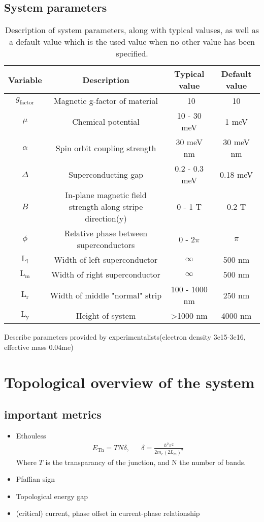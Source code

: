 \documentclass[10pt,a4paper]{article}
\begin{document}
	\subsection{System parameters}
	\begin{table}
		\begin{tabular}{|c|c|c|c|}
			\hline 
			Variable & Description & Typical value & Default value \\ 
			\hline 
			$g_\text{factor}$ & Magnetic g-factor of material & ~10 & 10 \\ 
			\hline 
			$\mu$ & Chemical potential &  10 - 30 meV & 1 meV\\ 
			\hline 
			$\alpha$ & Spin orbit coupling strength &  30 meV nm & 30 meV nm \\ 
			\hline 
			$\Delta$ & Superconducting gap & 0.2 - 0.3 meV & 0.18 meV\\ 
			\hline 
			$B$ & In-plane magnetic field strength along stripe direction(y) & 0 - 1 T & 0.2 T \\ 
			\hline 
			$\phi$ & Relative phase between superconductors &  0 - 2$\pi$ & $\pi$\\ 
			\hline 
			$\text{L}_\text{l}$ & Width of left superconductor & $\infty$ & 500 nm \\
			\hline 
			$\text{L}_\text{m}$ & Width of right superconductor & $\infty$ & 500 nm \\
			\hline
			$\text{L}_\text{r}$ & Width of middle "normal" strip & 100 - 1000 nm & 250 nm \\
			\hline
			$\text{L}_\text{y}$ & Height of system & \textgreater1000 nm & 4000 nm\\
			\hline
		\end{tabular} 
	\caption{Description of system parameters, along with typical valuses, as well as a default value which is the used value when no other value has been specified.}
	\label{tbl:system_pars}
	\end{table}
	Describe parameters provided by experimentalists(electron density 3e15-3e16, effective mass 0.04me)
\section{Topological overview of the system}
	\subsection{important metrics}
		\begin{itemize}
			\item \Gls{Ethouless}
				\begin{align}\label{eq:thouless}
				E_\text{Th} = TN\delta
				, && \delta = \frac{\hbar^2 \pi^2}
				{2 m_e \left( 2 L_m \right)^2}
				\end{align}
			Where $T$ is the transparancy of the junction, and N the number of bands.
			\item Pfaffian sign
			\item Topological energy gap
			\item (critical) current, phase offset in current-phase relationship
		\end{itemize}
\end{document}
